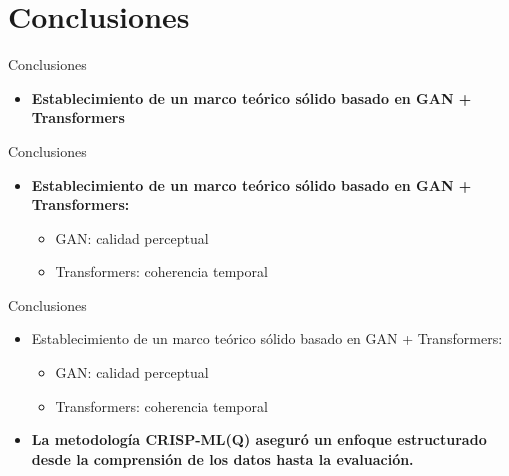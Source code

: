 \documentclass{beamer}
\begin{document}
\section{Conclusiones}
\begin{frame}{Conclusiones}
  \hspace{2cm}
  \begin{itemize}
    \item \textbf{Establecimiento de un marco teórico sólido basado en GAN + Transformers}
\end{itemize}
\end{frame}

\begin{frame}{Conclusiones}
  \hspace{2cm}
  \begin{itemize}
    \item \textbf{Establecimiento de un marco teórico sólido basado en GAN + Transformers:}
    \begin{itemize}
      \item GAN: calidad perceptual
      \item Transformers: coherencia temporal
    \end{itemize}
\end{itemize}
\end{frame}

\begin{frame}{Conclusiones}
  \hspace{2cm}
  \begin{itemize}
    \item Establecimiento de un marco teórico sólido basado en GAN + Transformers:
      \begin{itemize}
        \item GAN: calidad perceptual
        \item Transformers: coherencia temporal
      \end{itemize}
    \item \textbf{La metodología CRISP-ML(Q) aseguró un enfoque estructurado desde la comprensión de los datos hasta la evaluación.}
\end{itemize}
\end{frame}
\end{document}
